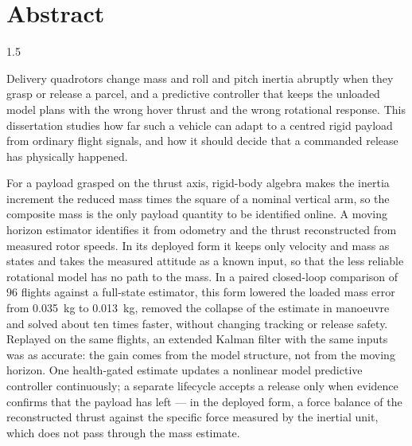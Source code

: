 \newpage
\chapter*{\centering Abstract}

\begin{spacing}{1.5}
\setlength{\parskip}{0.18in}

Delivery quadrotors change mass and roll and pitch inertia abruptly when they
grasp or release a parcel, and a predictive controller that keeps the unloaded
model plans with the wrong hover thrust and the wrong rotational response. This
dissertation studies how far such a vehicle can adapt to a centred rigid payload
from ordinary flight signals, and how it should decide that a commanded release
has physically happened.

For a payload grasped on the thrust axis, rigid-body algebra makes the inertia
increment the reduced mass times the square of a nominal vertical arm, so the
composite mass is the only payload quantity to be identified online. A moving horizon estimator
identifies it from odometry and the thrust reconstructed from measured rotor
speeds. In its deployed form it keeps only velocity and mass as states and takes
the measured attitude as a known input, so that the less reliable rotational
model has no path to the mass. In a paired closed-loop comparison of $96$
flights against a full-state estimator, this form lowered the loaded mass error
from \SI{0.035}{\kg} to \SI{0.013}{\kg}, removed the collapse of the estimate in
manoeuvre and solved about ten times faster, without changing tracking or release
safety. Replayed on the same flights, an extended Kalman filter with the same
inputs was as accurate: the gain comes from the model structure, not from the
moving horizon. One
health-gated estimate updates a nonlinear model predictive controller
continuously; a separate lifecycle accepts a release only when evidence
confirms that the payload has left --- in the deployed form, a force balance of
the reconstructed thrust against the specific force measured by the inertial
unit, which does not pass through the mass estimate.


\end{spacing}

